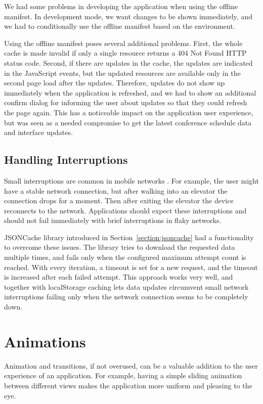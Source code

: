 We had some problems in developing the application when using the
offline manifest. In development mode, we want changes to be shown
immediately, and we had to conditionally use the offline manifest
based on the environment.

Using the offline manifest poses several additional problems. First,
the whole cache is made invalid if only a single resource returns a
404 Not Found HTTP status code. Second, if there are updates in the
cache, the updates are indicated in the JavaScript events, but the
updated resources are available only in the second page load after the
updates. Therefore, updates do not show up immediately when the
application is refreshed, and we had to show an additional confirm
dialog for informing the user about updates so that they could refresh
the page again. This has a noticeable impact on the application user
experience, but was seen as a needed compromise to get the latest
conference schedule data and interface updates.

\subsection{Handling Interruptions}

Small interruptions are common in mobile networks \citationneeded. For
example, the user might have a stable network connection, but after
walking into an elevator the connection drops for a moment. Then after
exiting the elevator the device reconnects to the
network. Applications should expect these interruptions and should not
fail immediately with brief interruptions in flaky networks.

JSONCache library introduced in Section~\ref{section:jsoncache} had a
functionality to overcome these issues. The library tries to download
the requested data multiple times, and fails only when the configured
maximum attempt count is reached. With every iteration, a timeout is
set for a new request, and the timeout is increased after each failed
attempt. This approach works very well, and together with localStorage
caching lets data updates circumvent small network interruptions
failing only when the network connection seems to be completely down.

\section{Animations}
\label{section:animations}

Animation and transitions, if not overused, can be a valuable addition
to the user experience of an application. For example, having a simple
sliding animation between different views makes the application more
uniform and pleasing to the eye.

